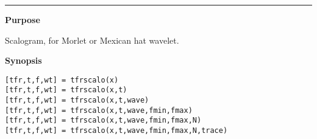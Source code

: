 

\hspace*{-1.6cm}{\Large \bf tfrscalo}

\vspace*{-.4cm}
\hspace*{-1.6cm}\rule[0in]{16.5cm}{.02cm}
\vspace*{.2cm}

{\bf \large {}\selectfont Purpose}\\
\hspace*{1.5cm}
\begin{minipage}[t]{13.5cm}
Scalogram, for Morlet or Mexican hat wavelet.
\end{minipage}
\vspace*{.5cm}

{\bf \large {}\selectfont Synopsis}\\
\hspace*{1.5cm}
\begin{minipage}[t]{13.5cm}
\begin{verbatim}
[tfr,t,f,wt] = tfrscalo(x)
[tfr,t,f,wt] = tfrscalo(x,t)
[tfr,t,f,wt] = tfrscalo(x,t,wave)
[tfr,t,f,wt] = tfrscalo(x,t,wave,fmin,fmax)
[tfr,t,f,wt] = tfrscalo(x,t,wave,fmin,fmax,N)
[tfr,t,f,wt] = tfrscalo(x,t,wave,fmin,fmax,N,trace)
\end{verbatim}
\end{minipage}
\vspace*{.5cm}


